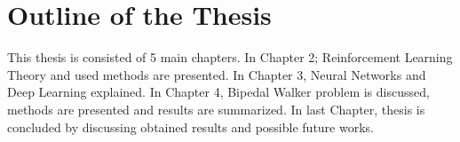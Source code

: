 \section{Outline of the Thesis}
\label{sec:outline}
This thesis is consisted of 5 main chapters. 
In Chapter 2; Reinforcement Learning Theory and used methods are presented. 
In Chapter 3, Neural Networks and Deep Learning explained. 
In Chapter 4, Bipedal Walker problem is discussed, methods are presented and results are summarized. 
In last Chapter, thesis is concluded by discussing obtained results and possible future works.

